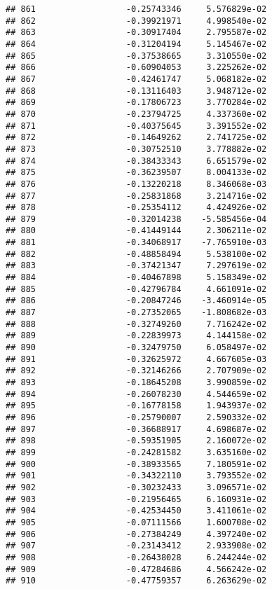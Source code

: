 \documentclass[
]{article}
\begin{document}
\begin{verbatim}
## 861                  -0.25743346     5.576829e-02
## 862                  -0.39921971     4.998540e-02
## 863                  -0.30917404     2.795587e-02
## 864                  -0.31204194     5.145467e-02
## 865                  -0.37538665     3.310550e-02
## 866                  -0.60904053     3.225262e-02
## 867                  -0.42461747     5.068182e-02
## 868                  -0.13116403     3.948712e-02
## 869                  -0.17806723     3.770284e-02
## 870                  -0.23794725     4.337360e-02
## 871                  -0.40375645     3.391552e-02
## 872                  -0.14649262     2.741725e-02
## 873                  -0.30752510     3.778882e-02
## 874                  -0.38433343     6.651579e-02
## 875                  -0.36239507     8.004133e-02
## 876                  -0.13220218     8.346068e-03
## 877                  -0.25831868     3.214716e-02
## 878                  -0.25354112     4.424926e-02
## 879                  -0.32014238    -5.585456e-04
## 880                  -0.41449144     2.306211e-02
## 881                  -0.34068917    -7.765910e-03
## 882                  -0.48858494     5.538100e-02
## 883                  -0.37421347     7.297619e-02
## 884                  -0.40467898     5.158349e-02
## 885                  -0.42796784     4.661091e-02
## 886                  -0.20847246    -3.460914e-05
## 887                  -0.27352065    -1.808682e-03
## 888                  -0.32749260     7.716242e-02
## 889                  -0.22839973     4.144158e-02
## 890                  -0.32479750     6.058497e-02
## 891                  -0.32625972     4.667605e-03
## 892                  -0.32146266     2.707909e-02
## 893                  -0.18645208     3.990859e-02
## 894                  -0.26078230     4.544659e-02
## 895                  -0.16778158     1.943937e-02
## 896                  -0.25790007     2.590332e-02
## 897                  -0.36688917     4.698687e-02
## 898                  -0.59351905     2.160072e-02
## 899                  -0.24281582     3.635160e-02
## 900                  -0.38933565     7.180591e-02
## 901                  -0.34322110     3.793552e-02
## 902                  -0.30232433     3.096571e-02
## 903                  -0.21956465     6.160931e-02
## 904                  -0.42534450     3.411061e-02
## 905                  -0.07111566     1.600708e-02
## 906                  -0.27384249     4.397240e-02
## 907                  -0.23143412     2.933908e-02
## 908                  -0.26438028     6.244244e-02
## 909                  -0.47284686     4.566242e-02
## 910                  -0.47759357     6.263629e-02

\end{verbatim}
\end{document}
